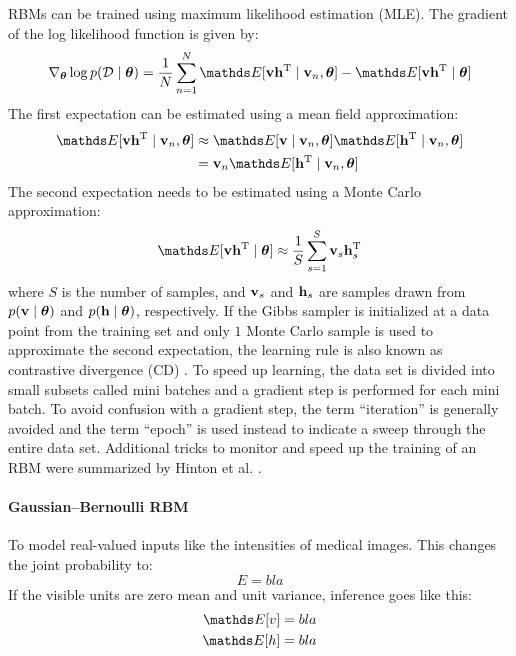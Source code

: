 \documentclass{report}
\begin{document}
RBMs can be trained using maximum likelihood estimation (MLE). The gradient of
the log likelihood function is given by:
\begin{equation}
\nabla_{\thetas} \log p(\mathcal{D} \given \thetas) =
\frac{1}{N} \sum_{n = 1}^N
\E[\vect{v}\vect{h}^\text{T} \given \vect{v}_n, \thetas]
-\E[\vect{v}\vect{h}^\text{T} \given \thetas]
\end{equation}
The first expectation can be estimated using a mean field approximation:
\begin{align}
\E[\vect{v}\vect{h}^\text{T} \given \vect{v}_n, \thetas] &\approx
\E[\vect{v} \given \vect{v}_n, \thetas]
\E[\vect{h}^\text{T} \given \vect{v}_n, \thetas] \\
&=\vect{v}_n\E[\vect{h}^\text{T} \given \vect{v}_n, \thetas]
\end{align}
The second expectation needs to be estimated using a Monte Carlo approximation:
\begin{equation}
\E[\vect{v}\vect{h}^\text{T} \given \thetas] \approx
\frac{1}{S}\sum_{s=1}^{S}\vect{v}_s\vect{h}_s^\text{T}
\end{equation}
where $S$ is the number of samples, and $\mathbf{v}_s$ and $\mathbf{h}_s$ are
samples drawn from $p(\mathbf{v}\mid \boldsymbol{\theta})$ and $p(\mathbf{h}\mid \boldsymbol{\theta})$,
respectively. If the Gibbs sampler is initialized at a data point from the
training set and only $1$ Monte Carlo sample is used to approximate the second
expectation, the learning rule is also known as contrastive divergence (CD)
\cite{Hinton2002}. To speed up learning, the data set is divided into small
subsets called mini batches and a gradient step is performed for each mini
batch. To avoid confusion with a gradient step, the term ``iteration'' is
generally avoided and the term ``epoch'' is used instead to indicate a sweep
through the entire data set. Additional tricks to monitor and speed up the
training of an RBM were summarized by Hinton et al. \cite{Hinton_2010}.

\paragraph{Gaussian--Bernoulli RBM} To model real-valued inputs like the
intensities of medical images. This changes the joint probability to:
\begin{equation} 
E = bla
\end{equation}
If the visible units are zero mean and unit variance, inference goes like this:
\begin{align} 
\E[v] &= bla \\
\E[h] &= bla
\end{align}
\end{document}
